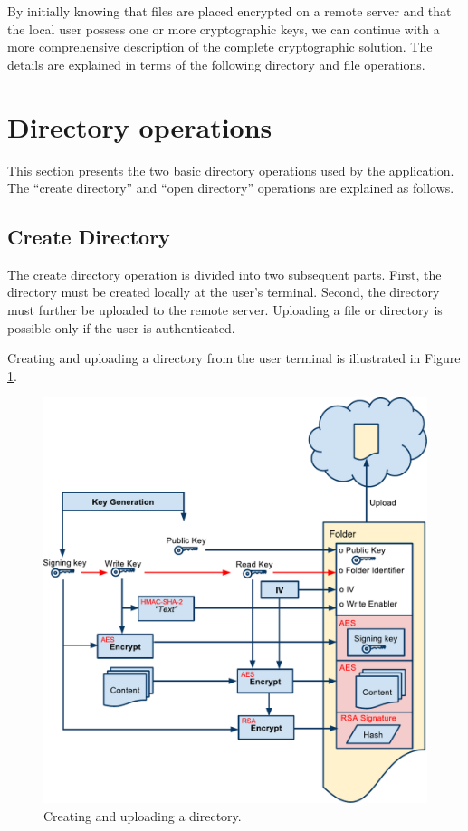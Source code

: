 \documentclass[pdftex,english,10pt,b5paper,twoside]{book}
\begin{document}
By initially knowing that files are placed encrypted on a remote server and that
the local user possess one or more cryptographic keys, we can continue with a
more comprehensive description of the complete cryptographic solution. The
details are explained in terms of the following directory and file operations.

\section{Directory operations}
\label{sec:CS:DO}

This section presents the two basic directory operations used by the
application. The ``create directory'' and ``open directory'' operations are
explained as follows.

\subsection{Create Directory}

The create directory operation is divided into two subsequent parts. First, the
directory must be created locally at the user's terminal. Second, the directory
must further be uploaded to the remote server.  Uploading a file or directory is
possible only if the user is authenticated.

Creating and uploading a directory from the user terminal is illustrated in
Figure \ref{fig:CS:CD}.

\begin{figure}[h!]
    \centering
        \includegraphics[width=\columnwidth]{CryptoCreateFolder.pdf}
	    \caption{Creating and uploading a directory.}
    \label{fig:CS:CD}
\end{figure}
\end{document}
